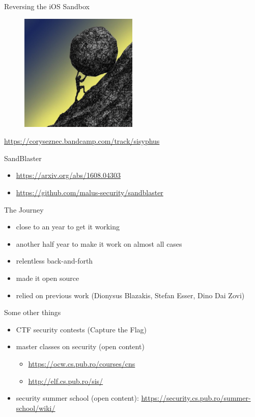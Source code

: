 \documentclass{simple}
\begin{document}
\begin{frame}{Reversing the iOS Sandbox}
  \begin{figure}
    \centering
    \includegraphics[width=0.5\textwidth]{img/sisyphus}
  \end{figure}
  \begin{center}
    \tiny
    \url{https://coryseznec.bandcamp.com/track/sisyphus}
  \end{center}
  \vspace{0.5cm}
  \pause SandBlaster
  \begin{itemize}
    \item \pause \url{https://arxiv.org/abs/1608.04303}
    \item \pause \url{https://github.com/malus-security/sandblaster}
  \end{itemize}
\end{frame}

\begin{frame}{The Journey}
  \begin{itemize}
    \pause \item close to an year to get it working
    \pause \item another half year to make it work on almost all cases
    \pause \item relentless back-and-forth
    \pause \item made it open source
    \pause \item relied on previous work (Dionysus Blazakis, Stefan Esser, Dino Dai Zovi)
  \end{itemize}
\end{frame}

\begin{frame}{Some other things}
  \begin{itemize}
    \pause \item CTF security contests (Capture the Flag)
    \pause \item master classes on security (open content)
      \begin{itemize}
        \pause \item \url{https://ocw.cs.pub.ro/courses/cns}
        \pause \item \url{http://elf.cs.pub.ro/sis/}
      \end{itemize}
    \pause \item security summer school (open content): \url{https://security.cs.pub.ro/summer-school/wiki/}
  \end{itemize}
\end{frame}
\end{document}
